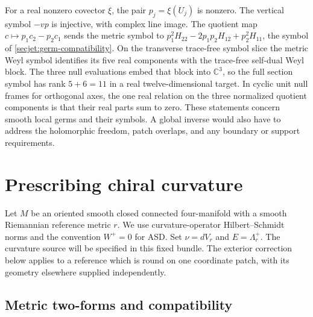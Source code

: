 \documentclass[11pt]{article}
\numberwithin{equation}{section}
\theoremstyle{definition}
\theoremstyle{remark}
\begin{document}
For a real nonzero covector \(\xi\), the pair \(p_j=\xi(U_j)\)
is nonzero. The vertical symbol \(-vp\) is injective, with complex
line image. The quotient map \(c\mapsto p_1c_2-p_2c_1\) sends the
metric symbol to \(p_1^2H_{22}-2p_1p_2H_{12}+p_2^2H_{11}\), the
symbol of \eqref{secjet:germ-compatibility}. On the transverse
trace-free symbol slice the metric Weyl symbol identifies its five
real components with the trace-free self-dual Weyl block. The three
null evaluations embed that block into \(\mathbb C^3\), so the full
section symbol has rank \(5+6=11\) in a real twelve-dimensional
target. In cyclic unit null frames for orthogonal axes, the one
real relation on the three normalized quotient components is that
their real parts sum to zero. These statements concern smooth local
germs and their symbols. A global inverse would also have to
address the holomorphic freedom, patch overlaps, and any boundary
or support requirements.

\section{Prescribing chiral curvature}\label{sec:lift}

Let \(M\) be an oriented smooth closed connected four-manifold with a
smooth Riemannian reference metric \(r\). We use curvature-operator
Hilbert--Schmidt norms and the convention \(W^+=0\) for ASD. Set
\(\nu=dV_r\) and \(E=\Lambda_r^+\). The curvature source will be specified
in this fixed bundle. The exterior correction below applies to a reference
which is round on one coordinate patch, with its geometry elsewhere
supplied independently.

\subsection{Metric two-forms and compatibility}
\end{document}
